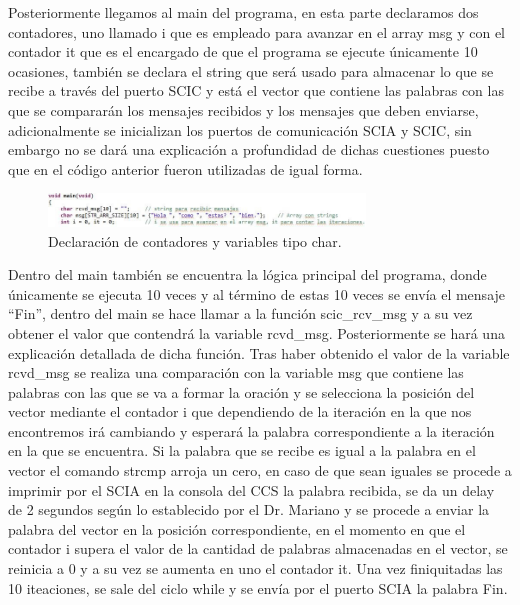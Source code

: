 \documentclass[12pt, letterpaper]{article}
\begin{document}
Posteriormente llegamos al main del programa, en esta parte declaramos dos contadores, uno llamado i que es empleado para avanzar en el array msg y con el contador it que es el encargado de que el programa se ejecute únicamente 10 ocasiones, también se declara el string que será usado para almacenar lo que se recibe a través del puerto SCIC y está el vector que contiene las palabras con las que se compararán los mensajes recibidos y los mensajes que deben enviarse, adicionalmente se inicializan los puertos de comunicación SCIA y SCIC, sin embargo no se dará una explicación a profundidad de dichas cuestiones puesto que en el código anterior fueron utilizadas de igual forma.

\begin{figure}[H]
    \centering
    \includegraphics[width=0.75\textwidth]{img/desarrollo/DES_2.jpg}
    \caption{Declaración de contadores y variables tipo char.}
\end{figure}

Dentro del main también se encuentra la lógica principal del programa, donde únicamente se ejecuta 10 veces y al término de estas 10 veces se envía el mensaje “Fin”, dentro del main se hace llamar a la función scic\_rcv\_msg y a su vez obtener el valor que contendrá la variable rcvd\_msg. Posteriormente se hará una explicación detallada de dicha función. Tras haber obtenido el valor de la variable rcvd\_msg se realiza una comparación con la variable msg que contiene las palabras con las que se va a formar la oración y se selecciona la posición del vector mediante el contador i que dependiendo de la iteración en la que nos encontremos irá cambiando y esperará la palabra correspondiente a la iteración en la que se encuentra. Si la palabra que se recibe es igual a la palabra en el vector el comando strcmp arroja un cero, en caso de que sean iguales se procede a imprimir por el SCIA en la consola del CCS la palabra recibida, se da un delay de 2 segundos según lo establecido por el Dr. Mariano y se procede a enviar la palabra del vector en la posición correspondiente, en el momento en que el contador i supera el valor de la cantidad de palabras almacenadas en el vector, se reinicia a 0 y a su vez se aumenta en uno el contador it. Una vez finiquitadas las 10 iteaciones, se sale del ciclo while y se envía por el puerto SCIA la palabra Fin.
\end{document}
